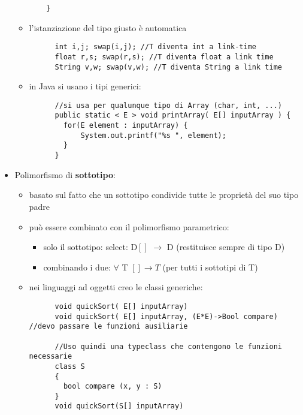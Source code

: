 \documentclass[12pt]{extarticle}
\begin{document}
\begin{flushleft}
\begin{itemize}
\begin{itemize}
\begin{lstlisting}
    }
  \end{lstlisting}
    \item l'istanziazione del tipo giusto è automatica
    \begin{lstlisting}
      int i,j; swap(i,j); //T diventa int a link-time
      float r,s; swap(r,s); //T diventa float a link time
      String v,w; swap(v,w); //T diventa String a link time
    \end{lstlisting}
    \item in Java si usano i tipi generici:
    \begin{lstlisting}
      //si usa per qualunque tipo di Array (char, int, ...)
      public static < E > void printArray( E[] inputArray ) {
        for(E element : inputArray) {
            System.out.printf("%s ", element);
        }
      }
    \end{lstlisting} 
  \end{itemize} 
  \item Polimorfismo di \textbf{sottotipo}:
  \begin{itemize}
    \item basato sul fatto che un sottotipo condivide tutte le proprietà del suo tipo padre
    \item può essere combinato con il polimorfismo parametrico:
    \begin{itemize}
      \item solo il sottotipo: select: D$[]$ $\rightarrow$ D (restituisce sempre di tipo D)
      \item combinando i due: $\forall$ T $ [] \rightarrow T$ (per tutti i sottotipi di T)
    \end{itemize}
    \item nei linguaggi ad oggetti creo le classi generiche:
    \begin{lstlisting}
      void quickSort( E[] inputArray)
      void quickSort( E[] inputArray, (E*E)->Bool compare) //devo passare le funzioni ausiliarie

      //Uso quindi una typeclass che contengono le funzioni necessarie
      class S
      {
        bool compare (x, y : S)
      }
      void quickSort(S[] inputArray)
    \end{lstlisting}
  \end{itemize}
\end{itemize}

\end{flushleft}
\end{document}
